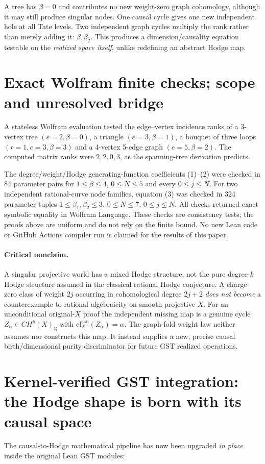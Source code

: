 \documentclass[11pt]{article}
\begin{document}
A tree has $\beta=0$ and contributes no new weight-zero graph
cohomology, although it may still produce singular nodes.
One causal cycle gives one new independent hole at all Tate levels.
Two independent graph cycles multiply the rank rather than merely
adding it: $\beta_1\beta_2$.
This produces a dimension/causality equation testable on the
\emph{realized space itself}, unlike redefining an abstract Hodge map.

\section{Exact Wolfram finite checks; scope and unresolved bridge}
A stateless Wolfram evaluation tested the edge--vertex incidence
ranks of a 3-vertex tree $(e=2,\beta=0)$, a triangle
$(e=3,\beta=1)$, a bouquet of three loops
$(r=1,e=3,\beta=3)$ and a 4-vertex 5-edge graph
$(e=5,\beta=2)$.  The computed matrix ranks were
$2,2,0,3$, as the spanning-tree derivation predicts.

The degree/weight/Hodge generating-function coefficients (1)--(2)
were checked in 84 parameter pairs for $1\leq\beta\leq4$,
$0\leq N\leq5$ and every $0\leq j\leq N$.
For two independent rational-curve node families, equation (3)
was checked in 324 parameter tuples
$1\leq\beta_1,\beta_2\leq3$, $0\leq N\leq7$,
$0\leq j\leq N$.
All checks returned exact symbolic equality in Wolfram Language.
These checks are consistency tests; the proofs above are uniform
and do not rely on the finite bound. No new Lean code or GitHub
Actions compiler run is claimed for the results of this paper.

\paragraph{Critical nonclaim.}
A singular projective world has a mixed Hodge structure, not the
pure degree-$k$ Hodge structure assumed in the classical rational
Hodge conjecture. A charge-zero class of weight $2j$ occurring in
cohomological degree $2j+2$ \emph{does not become} a counterexample
to rational algebraicity on smooth projective $X$.
For an unconditional original-$X$ proof the independent missing
map is a genuine cycle
$Z_\alpha\in CH^p(X)_{\mathbb Q}$ with
$\mathrm{cl}^{\mathrm{can}}_X(Z_\alpha)=\alpha$.
The graph-fold weight law neither assumes nor constructs this map.
It instead supplies a new, precise causal birth/dimensional purity
discriminator for future GST realized operations.


\section{Kernel-verified GST integration: the Hodge shape is born with its causal space}
The causal-to-Hodge mathematical pipeline has now been upgraded
\emph{in place} inside the original Lean GST modules:
\end{document}
